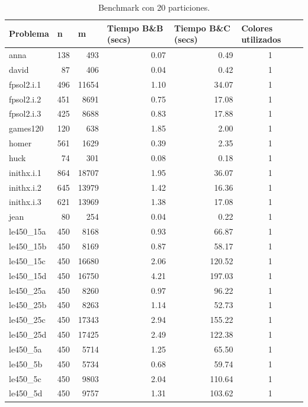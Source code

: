 \begin{table}[H]
\centering
\caption{Benchmark con 20 particiones.}
\begin{tabular}{|l|r|r|r|r|c|}
\hline
Problema & \multicolumn{1}{l|}{n} & \multicolumn{1}{l|}{m} & \multicolumn{1}{l|}{Tiempo B\&B (secs)} & \multicolumn{1}{l|}{Tiempo B\&C (secs)} & \multicolumn{1}{l|}{Colores utilizados} \\ \hline
anna & 138 & 493 & 0.07 & 0.49 & 1 \\ \hline
david & 87 & 406 & 0.04 & 0.42 & 1 \\ \hline
fpsol2.i.1 & 496 & 11654 & 1.10 & 34.07 & 1 \\ \hline
fpsol2.i.2 & 451 & 8691 & 0.75 & 17.08 & 1 \\ \hline
fpsol2.i.3 & 425 & 8688 & 0.83 & 17.88 & 1 \\ \hline
games120 & 120 & 638 & 1.85 & 2.00 & 1 \\ \hline
homer & 561 & 1629 & 0.39 & 2.35 & 1 \\ \hline
huck & 74 & 301 & 0.08 & 0.18 & 1 \\ \hline
inithx.i.1 & 864 & 18707 & 1.95 & 36.07 & 1 \\ \hline
inithx.i.2 & 645 & 13979 & 1.42 & 16.36 & 1 \\ \hline
inithx.i.3 & 621 & 13969 & 1.38 & 17.08 & 1 \\ \hline
jean & 80 & 254 & 0.04 & 0.22 & 1 \\ \hline
le450\_15a & 450 & 8168 & 0.93 & 66.87 & 1 \\ \hline
le450\_15b & 450 & 8169 & 0.87 & 58.17 & 1 \\ \hline
le450\_15c & 450 & 16680 & 2.06 & 120.52 & 1 \\ \hline
le450\_15d & 450 & 16750 & 4.21 & 197.03 & 1 \\ \hline
le450\_25a & 450 & 8260 & 0.97 & 96.22 & 1 \\ \hline
le450\_25b & 450 & 8263 & 1.14 & 52.73 & 1 \\ \hline
le450\_25c & 450 & 17343 & 2.94 & 155.22 & 1 \\ \hline
le450\_25d & 450 & 17425 & 2.49 & 122.38 & 1 \\ \hline
le450\_5a & 450 & 5714 & 1.25 & 65.50 & 1 \\ \hline
le450\_5b & 450 & 5734 & 0.68 & 59.74 & 1 \\ \hline
le450\_5c & 450 & 9803 & 2.04 & 110.64 & 1 \\ \hline
le450\_5d & 450 & 9757 & 1.31 & 103.62 & 1 \\ \hline

\end{tabular}
\end{table}
